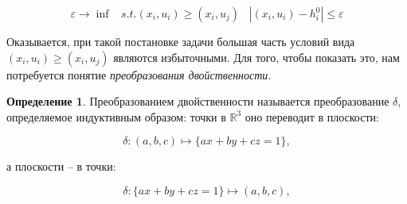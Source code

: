 \documentclass[a4paper, 10pt]{article}
\theoremstyle{definition}
\newtheorem{SmartDefinition}{Определение}
\theoremstyle{plain}
\theoremstyle{plain}
\begin{document}
\begin{equation}
\label{equation:infinity-problem}
 \varepsilon \to \inf \;\;\;
 s. t. (x_{i}, u_{i}) \geq (x_{i}, u_{j}) \;\;\;
 |(x_{i}, u_{i}) - h^{0}_{i}| \leq \varepsilon
\end{equation}

Оказывается, при такой постановке задачи большая часть условий вида
$(x_{i}, u_{i}) \geq (x_{i}, u_{j})$ являются избыточными. Для того, чтобы 
показать это, нам потребуется понятие \textit{преобразования двойственности}.

\begin{SmartDefinition}
 Преобразованием двойственности называется преобразование $\delta$, определяемое
 индуктивным образом: точки в $\mathbb{R}^{3}$ оно переводит в плоскости:
 
 \begin{equation}
  \delta: (a, b, c) \mapsto \{a x + b y + c z = 1\},
 \end{equation}
 
 а плоскости -- в точки:
 
 \begin{equation}
  \delta: \{a x + b y + c z = 1\} \mapsto (a, b, c),
 \end{equation}


\end{SmartDefinition}




\end{document}

